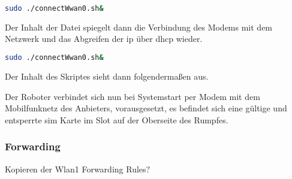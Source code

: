 \begin{lstlisting}[language=Bash]
sudo ./connectWwan0.sh&
\end{lstlisting}

\noindent Der Inhalt der Datei spiegelt dann die Verbindung des Modems mit dem Netzwerk und das Abgreifen der \gls{ip}
über \gls{dhcp} wieder.

\begin{lstlisting}[language=Bash]
sudo ./connectWwan0.sh&
\end{lstlisting}

\noindent Der Inhalt des Skriptes sieht dann folgendermaßen aus.



\noindent Der Roboter verbindet sich nun bei Systemstart per Modem mit dem Mobilfunknetz des Anbieters, vorausgesetzt,
es befindet sich eine gültige und entsperrte \gls{sim} Karte im Slot auf der Oberseite des Rumpfes.



\subsubsection{Forwarding}
\label{subsubsec:forwarding}
Kopieren der Wlan1 Forwarding Rules?

